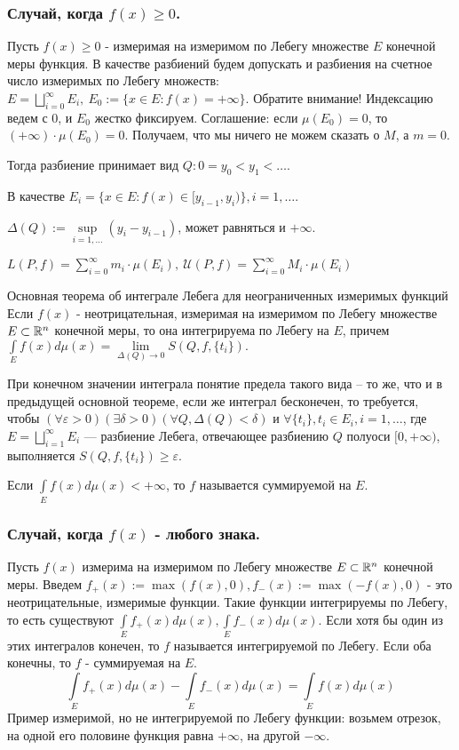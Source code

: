 \begin{multicols}{2}
\subsubsection*{Случай, когда $f(x)\geqslant 0$.}
Пусть $f(x)\geqslant 0$ - измеримая на измеримом по Лебегу множестве $E$ конечной меры функция. В качестве разбиений будем допускать и разбиения на счетное число измеримых по Лебегу множеств: $E = \bigsqcup\limits_{i=0 }^{\infty}E_i,\ E_0:=\{x\in E:f(x)=+\infty\}$. Обратите внимание! Индексацию ведем с 0, и $E_0$ жестко фиксируем. Соглашение: если $\mu(E_0)=0$, то $(+\infty)\cdot \mu(E_0)=0$. Получаем, что мы ничего не можем сказать о $M$, а $m=0$. 

Тогда разбиение принимает вид $Q: 0=y_0<y_1<\ldots$. 

В качестве $E_i = \{x\in E: f(x)\in[y_{i-1}, y_i)\}, i=1,\ldots$.

$\Delta(Q):=\sup\limits_{i=1, \ldots}(y_i-y_{i-1})$, может равняться и $+\infty$.

$L(P, f)=\sum\limits_{i=0}^{\infty}m_i\cdot \mu(E_i),\  \mathcal{U}(P, f)=\sum\limits_{i=0}^{\infty}M_i\cdot \mu(E_i)$ 

\begin{theorema}{Основная теорема об интеграле Лебега для неограниченных измеримых функций}{}
Если $f(x)$ - неотрицательная, измеримая на измеримом по Лебегу множестве $E\subset \mathbb{R}^n$ конечной меры, то она интегрируема по Лебегу на $E$, причем
$\int\limits_E f(x)d\mu(x)=\lim\limits_{\Delta(Q)\to0}S(Q, f, \{t_i\}).$ 

При конечном значении интеграла понятие предела такого вида -- то же, что и в предыдущей основной теореме, если же интеграл бесконечен, то требуется, чтобы \newline$(\forall \varepsilon>0)( \exists \delta > 0)(\forall Q, \Delta(Q)<\delta) \text{ и } \forall \{t_i\}, t_i \in E_i, i=1,\ldots$, где $E=\bigsqcup\limits_{i=1}^{\infty} E_i$ --- разбиение Лебега, отвечающее разбиению $Q$ полуоси $[0, +\infty)$, выполняется $S(Q, f, \{t_i\})\geqslant\varepsilon$.
\end{theorema}

\begin{definition}{}{}
Если $\int\limits_E f(x)d\mu(x) < +\infty$, то $f$ называется суммируемой на $E$.
\end{definition}

\subsubsection*{Случай, когда $f(x)$ - любого знака.}
Пусть $f(x)$ измерима на измеримом по Лебегу множестве $E \subset \mathbb{R}^n$ конечной меры. Введем $f_+(x):=\max(f(x), 0), f_-(x):=\max(-f(x), 0)$ - это неотрицательные, измеримые функции. Такие функции интегрируемы по Лебегу, то есть существуют $\int\limits_E f_+(x)d\mu(x), \int\limits_E f_-(x)d\mu(x)$. Если хотя бы один из этих интегралов конечен, то $f$ называется интегрируемой по Лебегу. Если оба конечны, то $f$ - суммируемая на $E$.
$$\int\limits_E f_+(x)d\mu(x)- \int\limits_E f_-(x)d\mu(x) = \int\limits_E f(x)d\mu(x)$$
Пример измеримой, но не интегрируемой по Лебегу функции: возьмем отрезок, на одной его половине функция равна $+\infty$, на другой $-\infty$.

\end{multicols}
